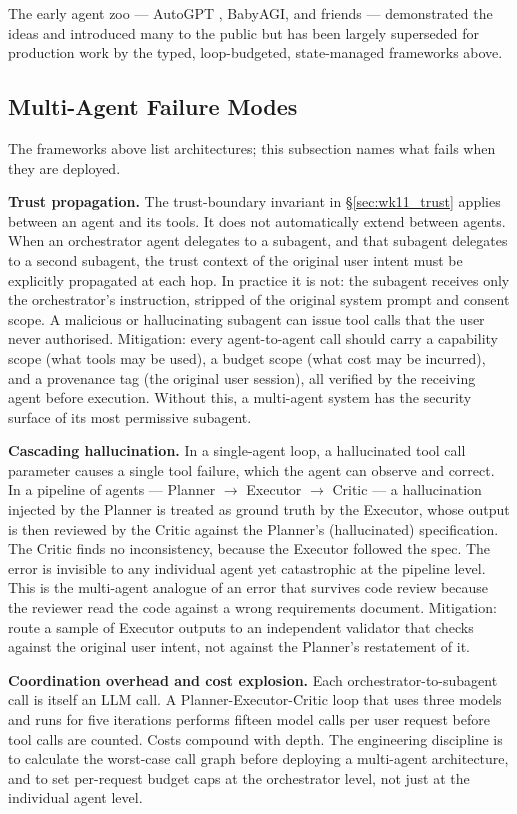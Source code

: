 The early agent zoo --- AutoGPT
\citep{significant_gravitas_autogpt}, BabyAGI, and friends ---
demonstrated the ideas and introduced many to the public but has
been largely superseded for production work by the typed,
loop-budgeted, state-managed frameworks above.

\subsection{Multi-Agent Failure Modes}

The frameworks above list architectures; this subsection names
what fails when they are deployed.

\textbf{Trust propagation.} The trust-boundary invariant in
\S\ref{sec:wk11_trust} applies between an agent and its tools.
It does not automatically extend between agents. When an
orchestrator agent delegates to a subagent, and that subagent
delegates to a second subagent, the trust context of the original
user intent must be explicitly propagated at each hop. In
practice it is not: the subagent receives only the orchestrator's
instruction, stripped of the original system prompt and consent
scope. A malicious or hallucinating subagent can issue tool calls
that the user never authorised. Mitigation: every agent-to-agent
call should carry a capability scope (what tools may be used),
a budget scope (what cost may be incurred), and a provenance tag
(the original user session), all verified by the receiving agent
before execution. Without this, a multi-agent system has the
security surface of its most permissive subagent.

\textbf{Cascading hallucination.} In a single-agent loop, a
hallucinated tool call parameter causes a single tool failure,
which the agent can observe and correct. In a pipeline of agents
--- Planner $\rightarrow$ Executor $\rightarrow$ Critic ---
a hallucination injected by the Planner is treated as ground
truth by the Executor, whose output is then reviewed by the
Critic against the Planner's (hallucinated) specification.
The Critic finds no inconsistency, because the Executor followed
the spec. The error is invisible to any individual agent yet
catastrophic at the pipeline level. This is the multi-agent
analogue of an error that survives code review because the
reviewer read the code against a wrong requirements document.
Mitigation: route a sample of Executor outputs to an independent
validator that checks against the original user intent, not
against the Planner's restatement of it.

\textbf{Coordination overhead and cost explosion.} Each
orchestrator-to-subagent call is itself an LLM call. A
Planner-Executor-Critic loop that uses three models and runs
for five iterations performs fifteen model calls per user
request before tool calls are counted. Costs compound with
depth. The engineering discipline is to calculate the worst-case
call graph before deploying a multi-agent architecture, and to
set per-request budget caps at the orchestrator level, not just
at the individual agent level.

